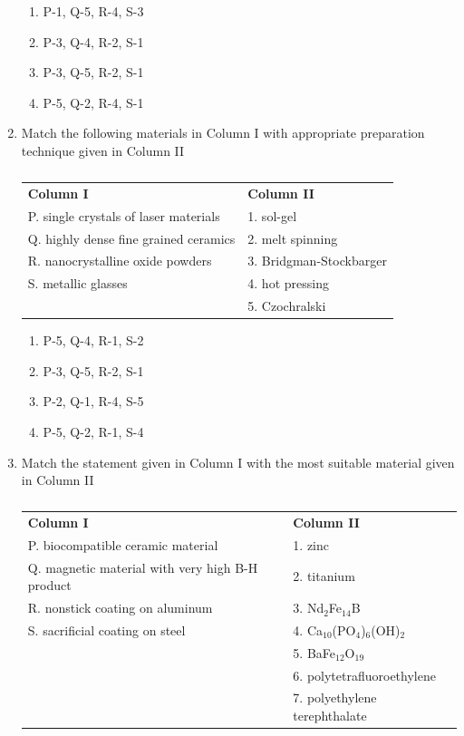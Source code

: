 \documentclass[a4paper,10pt]{article}
\begin{document}
\begin{enumerate}
\begin{multicols}{2}
\begin{enumerate}
\item P-1, Q-5, R-4, S-3
\item P-3, Q-4, R-2, S-1
\item P-3, Q-5, R-2, S-1
\item P-5, Q-2, R-4, S-1
\end{enumerate}
\end{multicols}

\item Match the following materials in Column I with appropriate preparation technique given in Column II
\begin{table}[H]
\centering
\begin{tabular}{ll}
\textbf{Column I} & \textbf{Column II} \\
P. single crystals of laser materials & 1. sol-gel \\
Q. highly dense fine grained ceramics & 2. melt spinning \\
R. nanocrystalline oxide powders & 3. Bridgman-Stockbarger \\
S. metallic glasses & 4. hot pressing \\
 & 5. Czochralski \\
\end{tabular}
\caption*{}
\label{tab:q12_mat}
\end{table}
\hfill{}

\begin{multicols}{2}
\begin{enumerate}
\item P-5, Q-4, R-1, S-2
\item P-3, Q-5, R-2, S-1
\item P-2, Q-1, R-4, S-5
\item P-5, Q-2, R-1, S-4
\end{enumerate}
\end{multicols}

\item Match the statement given in Column I with the most suitable material given in Column II
\begin{table}[H]
\centering
\begin{tabular}{ll}
\textbf{Column I} & \textbf{Column II} \\
P. biocompatible ceramic material & 1. zinc \\
Q. magnetic material with very high B-H product & 2. titanium \\
R. nonstick coating on aluminum & 3. Nd$_2$Fe$_{14}$B \\
S. sacrificial coating on steel & 4. Ca$_{10}$(PO$_4$)$_6$(OH)$_2$ \\
 & 5. BaFe$_{12}$O$_{19}$ \\
 & 6. polytetrafluoroethylene \\
 & 7. polyethylene terephthalate \\
\end{tabular}
\caption*{}
\label{tab:q13_mat}
\end{table}
\hfill{}


\end{enumerate}
\end{document}
